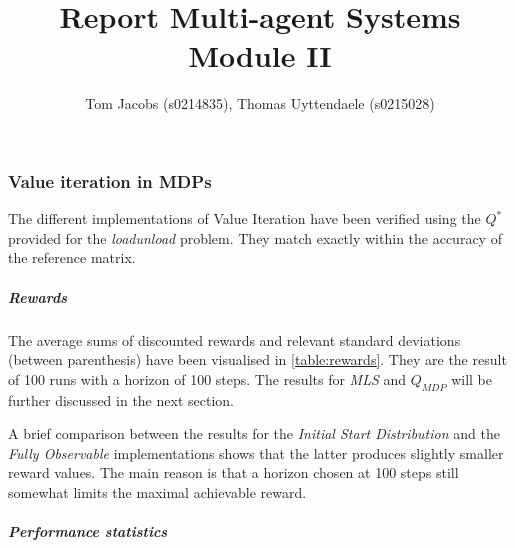 \documentclass[10pt,a4paper]{article}
\title{Report Multi-agent Systems Module II}
\author{Tom Jacobs (s0214835), Thomas Uyttendaele (s0215028)}
\begin{document}
\maketitle


\part{}


\section{Value iteration in MDPs}

The different implementations of Value Iteration have been verified using the $Q^{*}$ provided for the \emph{loadunload} problem. They match exactly within the accuracy of the reference matrix.


\subsubsection*{Rewards}

The average sums of discounted rewards and relevant standard deviations (between parenthesis) have been visualised in \ref{table:rewards}. 
They are the result of 100 runs with a horizon of 100 steps.
The results for \emph{MLS} and \emph{$Q_{MDP}$} will be further discussed in the next section.

A brief comparison between the results for the \emph{Initial Start Distribution} and the \emph{Fully Observable} implementations shows that the latter produces slightly smaller reward values. 
The main reason is that a horizon chosen at 100 steps still somewhat limits the maximal achievable reward.


\subsubsection*{Performance statistics}
\end{document}
